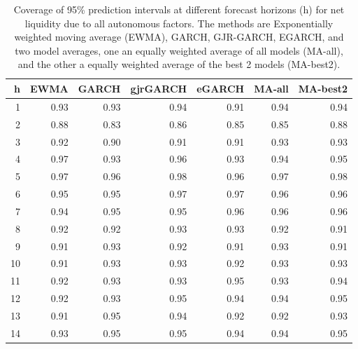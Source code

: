 \documentclass{article}
\begin{document}
\begin{table}[ht]
\centering
\begin{tabular}{rrrrrrr}
  \hline
h & EWMA & GARCH & gjrGARCH & eGARCH & MA-all & MA-best2 \\ 
  \hline
1 & 0.93 & 0.93 & 0.94 & 0.91 & 0.94 & 0.94 \\ 
  2 & 0.88 & 0.83 & 0.86 & 0.85 & 0.85 & 0.88 \\ 
  3 & 0.92 & 0.90 & 0.91 & 0.91 & 0.93 & 0.93 \\ 
  4 & 0.97 & 0.93 & 0.96 & 0.93 & 0.94 & 0.95 \\ 
  5 & 0.97 & 0.96 & 0.98 & 0.96 & 0.97 & 0.98 \\ 
  6 & 0.95 & 0.95 & 0.97 & 0.97 & 0.96 & 0.96 \\ 
  7 & 0.94 & 0.95 & 0.95 & 0.96 & 0.96 & 0.96 \\ 
  8 & 0.92 & 0.92 & 0.93 & 0.93 & 0.92 & 0.91 \\ 
  9 & 0.91 & 0.93 & 0.92 & 0.91 & 0.93 & 0.91 \\ 
  10 & 0.91 & 0.93 & 0.93 & 0.92 & 0.93 & 0.93 \\ 
  11 & 0.92 & 0.93 & 0.93 & 0.95 & 0.93 & 0.94 \\ 
  12 & 0.92 & 0.93 & 0.95 & 0.94 & 0.94 & 0.95 \\ 
  13 & 0.91 & 0.95 & 0.94 & 0.92 & 0.92 & 0.93 \\ 
  14 & 0.93 & 0.95 & 0.95 & 0.94 & 0.94 & 0.95 \\ 
   \hline
\end{tabular}
\caption{Coverage of 95\% prediction intervals at different forecast horizons (h) for net liquidity due to all autonomous factors. The methods are Exponentially weighted moving average (EWMA), GARCH, GJR-GARCH, EGARCH, and two model averages, one an equally weighted average of all models (MA-all), and the other a equally weighted average of the best 2 models (MA-best2).}
\label{tab:covagg}
\end{table}
\end{document}
